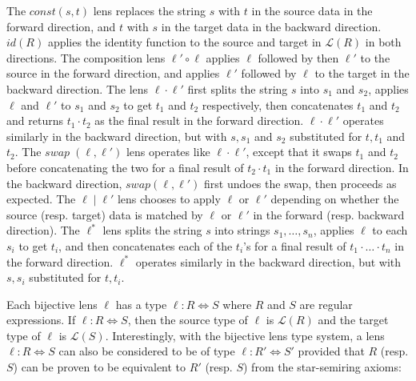 \documentclass{svproc}
\begin{document}
The $\mathit{const}(s, t)$ lens replaces the string $s$ with $t$ in the source
data in the forward direction, and $t$ with $s$ in the target data in the backward
direction. $\mathit{id}(R)$ applies the identity function to the source and target
in $\mathcal{L}(R)$ in both directions. The composition lens $\ell' \circ \ell$
applies $\ell$ followed by then $\ell'$ to the source in the forward direction,
and applies $\ell'$ followed by $\ell$ to the target in the backward direction.
The lens $\ell \cdot \ell'$ first splits the string $s$ into $s_1$ and $s_2$,
applies $\ell$ and $\ell'$ to $s_1$ and $s_2$ to get $t_1$ and $t_2$
respectively, then concatenates $t_1$ and $t_2$ and returns $t_1 \cdot t_2$ as
the final result in the forward direction. $\ell \cdot \ell'$ operates
similarly in the backward direction, but with $s, s_1$ and $s_2$ substituted
for $t, t_1$ and $t_2$. The $\mathit{swap} \; (\ell, \ell')$ lens operates
like $\ell \cdot \ell'$, except that it swaps $t_1$ and $t_2$ before
concatenating the two for a final result of $t_2 \cdot t_1$ in the forward
direction. In the backward direction, $\mathit{swap}(\ell, \ell')$ first undoes
the swap, then proceeds as expected. The $\ell \; | \; \ell'$ lens
chooses to apply $\ell$ or $\ell'$ depending on whether the source
(resp. target) data is matched by $\ell$ or $\ell'$ in the forward (resp.
backward direction). The $\ell^*$ lens splits the string $s$ into strings $s_1,
\ldots, s_n$, applies $\ell$ to each $s_i$ to get $t_i$, and then concatenates
each of the $t_i$'s for a final result of $t_1 \cdot \ldots \cdot t_n$ in the
forward direction. $\ell^*$ operates similarly in the backward direction, but
with $s, s_i$ substituted for $t, t_i$.

Each bijective lens $\ell$ has a type $\ell : R \Leftrightarrow S$ where $R$ and
$S$ are regular expressions. If $\ell : R \Leftrightarrow S$, then the source
type of $\ell$ is $\mathcal{L}(R)$ and the target type of $\ell$ is
$\mathcal{L}(S)$. Interestingly, with the bijective lens type system, a lens
$\ell : R \Leftrightarrow S$ can also be considered to be of type $\ell : R'
\Leftrightarrow S'$ provided that $R$ (resp. $S$) can be proven to be
equivalent to $R'$ (resp. $S$) from the star-semiring axioms:

\begin{prooftree}
\end{prooftree}
\end{document}
